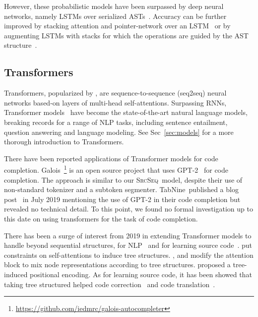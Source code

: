\documentclass[nonacm, sigconf]{acmart}
\newcommand{\abbr}[1]{\textsc{#1}~}
\newcommand{\SrcSeq}{\abbr{SrcSeq}} \newcommand{\SrcRNN}{\abbr{SrcRNN}} \newcommand{\LeafSeq}{\abbr{LeafSeq}} \newcommand{\RootPath}{\abbr{RootPath}} \newcommand{\LeafTokens}{\abbr{LeafTokens}} \newcommand{\DFS}{\abbr{DFS}} \newcommand{\TreeRel}{\abbr{DFS{ud}}} \newcommand{\TreeReli}{\abbr{DFS{ud+}}}
\newcommand{\secref}[1]{Sec~\ref{#1}}
\begin{document}
However, these probabilistic models have been surpassed by deep neural networks, namely LSTMs over serialized ASTs~\citep{liu2016neural-code-completion}.
Accuracy can be further improved by stacking attention and pointer-network over an LSTM~\citep{li2018code-rnn-attn}
or by augmenting LSTMs with stacks for which the operations are guided by the AST structure~\citep{liu2020modeling-stack-lstm}.


\subsection{Transformers}
Transformers, popularized by \citet{vaswani2017attention}, are sequence-to-sequence (seq2seq) neural networks based-on layers of multi-head self-attentions.
Surpassing RNNs, Transformer models~\citep{devlin2018bert,dong2019unified-unilm,radford2019language-gpt2} have become the state-of-the-art natural language models, breaking records for a range of NLP tasks, including sentence entailment, question answering and language modeling.
See \secref{sec:models} for a more thorough introduction to Transformers.

There have been reported applications of Transformer models for code completion.
Galois~\footnote{\url{https://github.com/iedmrc/galois-autocompleter}} is an open source project that uses GPT-2~\citep{radford2019language-gpt2} for code completion.
The approach is similar to our \SrcSeq model, despite their use of non-standard tokenizer and a subtoken segmenter.
TabNine\texttrademark~published a blog post~\citep{tabnine2019autocompletion} in July 2019 mentioning the use of GPT-2 in their code completion but revealed no technical detail.
To this point, we found no formal investigation up to this date on using transformers for the task of code completion. 

There has been a surge of interest from 2019 in extending Transformer models to handle beyond sequential structures, for NLP~\citep{wang2019tree-mask,ahmed2019you-traverse,nguyen2020treestructured-hierarchical} and for learning source code~\citep{harer2019tree-correction,shiv2019novel}.
\citet{wang2019tree-mask} put constraints on self-attentions to induce tree structures. 
\citet{ahmed2019you-traverse}, \citet{harer2019tree-correction} and \citet{nguyen2020treestructured-hierarchical} modify the attention block to mix node representations according to tree structures.
\citet{shiv2019novel} proposed a tree-induced positional encoding. 
As for learning source code, it has been showed that taking tree structured helped code correction~\citep{harer2019tree-correction} and code translation~\citep{shiv2019novel}.
\end{document}

